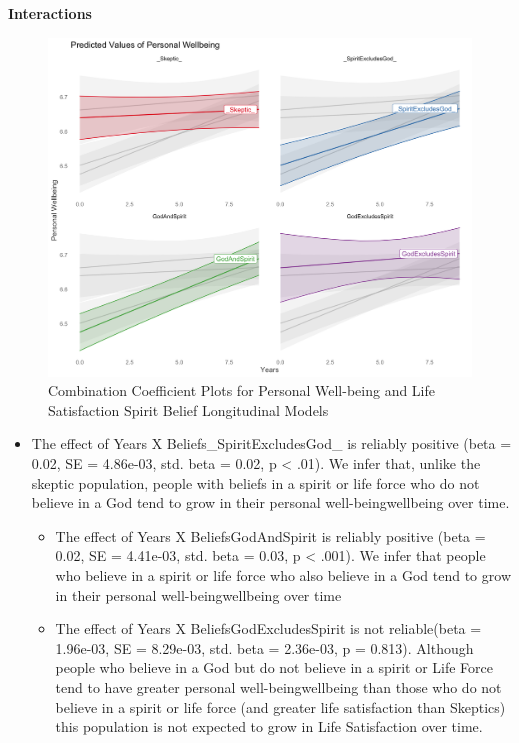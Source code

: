 \documentclass[
  english,
  man]{apa6}
\providecommand{\tightlist}{%
  \setlength{\itemsep}{0pt}\setlength{\parskip}{0pt}}
\begin{document}
\textbf{Interactions}

\begin{figure}

{\centering \includegraphics[width=6.4in]{Figs/USEPWI_expected-1} 

}

\caption{Combination Coefficient Plots for Personal Well-being and Life Satisfaction Spirit Belief Longitudinal Models}\label{fig:unnamed-chunk-7}
\end{figure}

\begin{itemize}
\tightlist
\item
  The effect of Years X Beliefs\_SpiritExcludesGod\_ is reliably positive (beta = 0.02, SE = 4.86e-03, std. beta = 0.02, p \textless{} .01). We infer that, unlike the skeptic population, people with beliefs in a spirit or life force who do not believe in a God tend to grow in their personal well-beingwellbeing over time.

  \begin{itemize}
  \tightlist
  \item
    The effect of Years X BeliefsGodAndSpirit is reliably positive (beta = 0.02, SE = 4.41e-03, std. beta = 0.03, p \textless{} .001). We infer that people who believe in a spirit or life force who also believe in a God tend to grow in their personal well-beingwellbeing over time
  \item
    The effect of Years X BeliefsGodExcludesSpirit is not reliable(beta = 1.96e-03, SE = 8.29e-03, std. beta = 2.36e-03, p = 0.813). Although people who believe in a God but do not believe in a spirit or Life Force tend to have greater personal well-beingwellbeing than those who do not believe in a spirit or life force (and greater life satisfaction than Skeptics) this population is not expected to grow in Life Satisfaction over time.
  \end{itemize}
\end{itemize}
\end{document}
